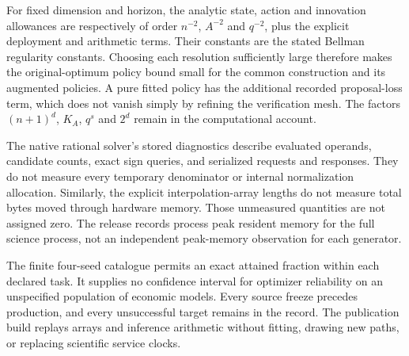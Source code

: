 For fixed dimension and horizon, the analytic state, action and innovation allowances are respectively of order $n^{-2}$, $A^{-2}$ and $q^{-2}$, plus the explicit deployment and arithmetic terms. Their constants are the stated Bellman regularity constants. Choosing each resolution sufficiently large therefore makes the original-optimum policy bound small for the common construction and its augmented policies. A pure fitted policy has the additional recorded proposal-loss term, which does not vanish simply by refining the verification mesh. The factors $(n+1)^d$, $K_A$, $q^s$ and $2^d$ remain in the computational account.

The native rational solver's stored diagnostics describe evaluated operands, candidate counts, exact sign queries, and serialized requests and responses. They do not measure every temporary denominator or internal normalization allocation. Similarly, the explicit interpolation-array lengths do not measure total bytes moved through hardware memory. Those unmeasured quantities are not assigned zero. The release records process peak resident memory for the full science process, not an independent peak-memory observation for each generator.

The finite four-seed catalogue permits an exact attained fraction within each declared task. It supplies no confidence interval for optimizer reliability on an unspecified population of economic models. Every source freeze precedes production, and every unsuccessful target remains in the record. The publication build replays arrays and inference arithmetic without fitting, drawing new paths, or replacing scientific service clocks.
